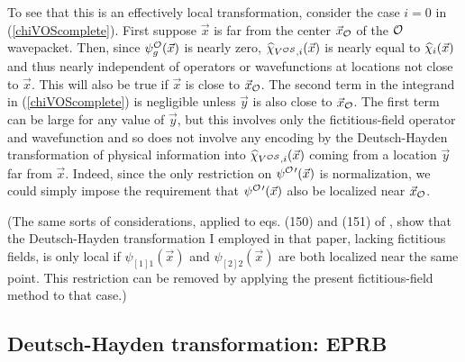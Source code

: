 \documentclass[12pt]{article}
\begin{document}
To see that this is an effectively local transformation, consider  the case $i=0$\/ in (\ref{chiVOScomplete}). 
First suppose $\vec{x}$\/ is far from the center $\vec{x}_\cO$\/ of the  $\cO$\/ wavepacket.
Then, since $\psi^\cO_g(\vec{x})$\/ is nearly zero, $\wh{\chi}_{V^{\cO\cS},i}(\vec{x})$\/ is nearly equal to 
$\widehat{\chi}_{i}(\vec{x})$\/ and thus nearly independent of operators or wavefunctions at locations 
not close to $\vec{x}$\/. This will also be true if  $\vec{x}$\/ is close to $\vec{x}_\cO$\/.
The second term in the integrand  in (\ref{chiVOScomplete}) is negligible unless $\vec{y}$\/ is also  close
to $\vec{x}_\cO$\/. The first term can be large for any value of $\vec{y}$\/, but this involves only the 
fictitious-field operator and wavefunction and so does not involve any encoding by the Deutsch-Hayden transformation of physical information into  
$\wh{\chi}_{V^{\cO\cS},i}(\vec{x})$\/ coming from a location $\vec{y}$\/ far from $\vec{x}$\/. Indeed, since the only
restriction on $\psi^{\cO\prime}(\vec{x})$\/ is normalization, we could simply impose the requirement that $\psi^{\cO\prime}(\vec{x})$\/
also be localized near $\vec{x}_\cO$\/.

(The same sorts of considerations, applied to  eqs. (150) and (151) of \cite{Rubin02}, show that the Deutsch-Hayden transformation I employed in  
that paper, lacking fictitious fields, is only local  if $\psi_{[1]1}(\vec{x})$\/  and $\psi_{[2]2}(\vec{x})$\/ are both
localized near the same point. This restriction can be removed by applying the present fictitious-field method to that case.)


\subsection{Deutsch-Hayden transformation: EPRB}\label{SecDHTEPRB}
\end{document}
